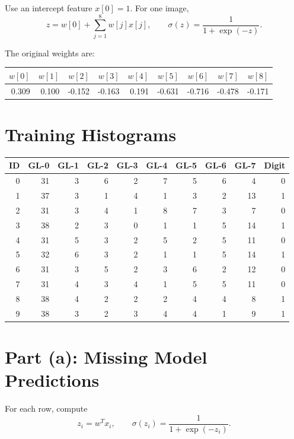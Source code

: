 \documentclass[11pt]{article}
\begin{document}
Use an intercept feature \(x[0]=1\). For one image,
\[
    z = w[0] + \sum_{j=1}^{8} w[j]x[j],
    \qquad
    \sigma(z)=\frac{1}{1+\exp(-z)}.
\]

The original weights are:

\begin{center}
\begin{tabular}{rrrrrrrrr}
\toprule
\(w[0]\) & \(w[1]\) & \(w[2]\) & \(w[3]\) & \(w[4]\) & \(w[5]\) & \(w[6]\) & \(w[7]\) & \(w[8]\) \\
\midrule
0.309 & 0.100 & -0.152 & -0.163 & 0.191 & -0.631 & -0.716 & -0.478 & -0.171 \\
\bottomrule
\end{tabular}
\end{center}

\section*{Training Histograms}

\begin{center}
\scriptsize
\begin{tabular}{rrrrrrrrrr}
\toprule
ID & GL-0 & GL-1 & GL-2 & GL-3 & GL-4 & GL-5 & GL-6 & GL-7 & Digit \\
\midrule
0 & 31 & 3 & 6 & 2 & 7 & 5 & 6 & 4 & 0 \\
1 & 37 & 3 & 1 & 4 & 1 & 3 & 2 & 13 & 1 \\
2 & 31 & 3 & 4 & 1 & 8 & 7 & 3 & 7 & 0 \\
3 & 38 & 2 & 3 & 0 & 1 & 1 & 5 & 14 & 1 \\
4 & 31 & 5 & 3 & 2 & 5 & 2 & 5 & 11 & 0 \\
5 & 32 & 6 & 3 & 2 & 1 & 1 & 5 & 14 & 1 \\
6 & 31 & 3 & 5 & 2 & 3 & 6 & 2 & 12 & 0 \\
7 & 31 & 4 & 3 & 4 & 1 & 5 & 5 & 11 & 0 \\
8 & 38 & 4 & 2 & 2 & 2 & 4 & 4 & 8 & 1 \\
9 & 38 & 3 & 2 & 3 & 4 & 4 & 1 & 9 & 1 \\
\bottomrule
\end{tabular}
\end{center}

\section*{Part (a): Missing Model Predictions}

For each row, compute
\[
    z_i = w^T x_i,
    \qquad
    \sigma(z_i)=\frac{1}{1+\exp(-z_i)}.
\]
\end{document}
